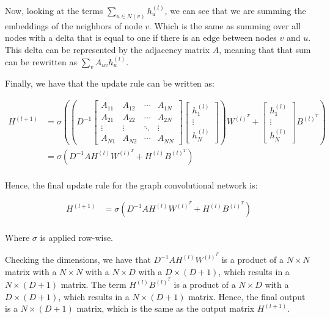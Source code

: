 \documentclass{article}
\begin{document}
Now, looking at the terms $\sum_{u \in N(v)} h_u^{(l)}$, we can see that we are summing the embeddings of the neighbors of node $v$.
Which is the same as summing over all nodes with a delta that is equal to one if there is an edge between nodes $v$ and $u$. This
delta can be represented by the adjacency matrix $A$, meaning that that sum can be rewritten as $\sum_{v} A_{uv} h_u^{(l)}$.

Finally, we have that the update rule can be written as:

\begin{align*}
    H^{(l+1)} & = \sigma \left( \left(
        D^{-1}
        \begin{bmatrix}
        A_{11} & A_{12} & \cdots & A_{1N} \\
        A_{21} & A_{22} & \cdots & A_{2N} \\
        \vdots & \vdots & \ddots & \vdots \\
        A_{N1} & A_{N2} & \cdots & A_{NN}
    \end{bmatrix}
    \begin{bmatrix}
        h_1^{(l)} \\
        \vdots \\
        h_N^{(l)}
    \end{bmatrix}
    \right) W^{(l)^T} + \begin{bmatrix}
        h_1^{(l)} \\
        \vdots \\
        h_N^{(l)}
    \end{bmatrix} B^{(l)^T}
    \right) \\
    &=
    \sigma \left(
        D^{-1} A H^{(l)} W^{(l)^T}
     + H^{(l)} B^{(l)^T}
    \right) \\
\end{align*}

Hence, the final update rule for the graph convolutional network is:

\begin{align*}
    H^{(l+1)} & = \sigma \left(
        D^{-1} A H^{(l)} W^{(l)^T}
     + H^{(l)} B^{(l)^T}
    \right) \\
\end{align*}

Where $\sigma$ is applied row-wise.

Checking the dimensions, we have that $D^{-1} A H^{(l)} W^{(l)^T}$ is a product of a $N \times N$ matrix with a $N \times N$ with a $N \times D$ with a $D \times (D + 1)$,
which results in a $N \times (D + 1)$ matrix. The term $H^{(l)} B^{(l)^T}$ is a product of a $N \times D$ with a $D \times (D + 1)$, which results in a $N \times (D + 1)$ matrix.
Hence, the final output is a $N \times (D + 1)$ matrix, which is the same as the output matrix $H^{(l + 1)}$.
\end{document}

